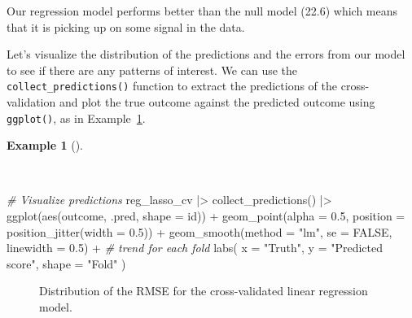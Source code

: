 \documentclass[
  letterpaper,
]{latex/krantz}
\newenvironment{Shaded}{\begin{snugshade}}{\end{snugshade}}
\newcommand{\AttributeTok}[1]{\textcolor[rgb]{0.00,0.00,0.00}{#1}}
\newcommand{\CommentTok}[1]{\textcolor[rgb]{0.00,0.00,0.00}{\textit{#1}}}
\newcommand{\ConstantTok}[1]{\textcolor[rgb]{0.00,0.00,0.00}{#1}}
\newcommand{\FloatTok}[1]{\textcolor[rgb]{0.00,0.00,0.00}{#1}}
\newcommand{\FunctionTok}[1]{\textcolor[rgb]{0.00,0.00,0.00}{#1}}
\newcommand{\NormalTok}[1]{\textcolor[rgb]{0.00,0.00,0.00}{#1}}
\newcommand{\SpecialCharTok}[1]{\textcolor[rgb]{0.00,0.00,0.00}{#1}}
\newcommand{\StringTok}[1]{\textcolor[rgb]{0.00,0.00,0.00}{#1}}
\theoremstyle{definition}
\newtheorem{example}{Example}[chapter]
\theoremstyle{remark}
\begin{document}
Our regression model performs better than the null model (22.6) which
means that it is picking up on some signal in the data.

Let's visualize the distribution of the predictions and the errors from
our model to see if there are any patterns of interest. We can use the
\texttt{collect\_predictions()} function to extract the predictions of
the cross-validation and plot the true outcome against the predicted
outcome using \texttt{ggplot()}, as in
Example~\ref{exm-pda-reg-lr-eval-rmse}.

\begin{example}[]\protect\hypertarget{exm-pda-reg-lr-eval-rmse}{}\label{exm-pda-reg-lr-eval-rmse}

~

\begin{Shaded}
\begin{Highlighting}[]
\CommentTok{\# Visualize predictions}
\NormalTok{reg\_lasso\_cv }\SpecialCharTok{|\textgreater{}}
  \FunctionTok{collect\_predictions}\NormalTok{() }\SpecialCharTok{|\textgreater{}}
  \FunctionTok{ggplot}\NormalTok{(}\FunctionTok{aes}\NormalTok{(outcome, .pred, }\AttributeTok{shape =}\NormalTok{ id)) }\SpecialCharTok{+}
  \FunctionTok{geom\_point}\NormalTok{(}\AttributeTok{alpha =} \FloatTok{0.5}\NormalTok{, }\AttributeTok{position =} \FunctionTok{position\_jitter}\NormalTok{(}\AttributeTok{width =} \FloatTok{0.5}\NormalTok{)) }\SpecialCharTok{+}
  \FunctionTok{geom\_smooth}\NormalTok{(}\AttributeTok{method =} \StringTok{"lm"}\NormalTok{, }\AttributeTok{se =} \ConstantTok{FALSE}\NormalTok{, }\AttributeTok{linewidth =} \FloatTok{0.5}\NormalTok{) }\SpecialCharTok{+} \CommentTok{\# trend for each fold}
  \FunctionTok{labs}\NormalTok{(}
    \AttributeTok{x =} \StringTok{"Truth"}\NormalTok{,}
    \AttributeTok{y =} \StringTok{"Predicted score"}\NormalTok{,}
    \AttributeTok{shape =} \StringTok{"Fold"}
\NormalTok{  )}
\end{Highlighting}
\end{Shaded}

\begin{figure}[H]


\caption{\label{fig-pda-reg-lr-eval-rmse}Distribution of the RMSE for
the cross-validated linear regression model.}

\end{figure}%

\end{example}
\end{document}
